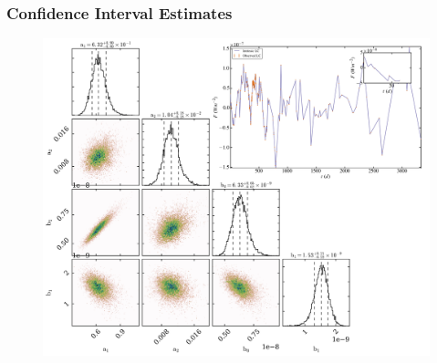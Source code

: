 \documentclass[hyperref={pdfpagelabels=false}]{beamer}
\begin{document}

\begin{frame}
\frametitle{Confidence Interval Estimates}
  \begin{figure}
    \includegraphics[scale=0.075]{images/CARMA(2,1)_Recovery.jpg}
  \end{figure}
\end{frame}
\end{document}
